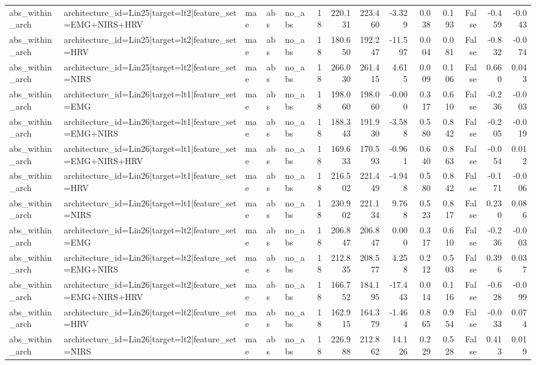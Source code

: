 \begin{table}
\begin{tabular}{lllllrrrrrrrrr}
abs_within_arch & architecture_id=Lin25|target=lt2|feature_set=EMG+NIRS+HRV & mae & abs & no_abs & 18 & 220.131 & 223.460 & -3.329 & 0.038 & 0.193 & False & -0.459 & -0.043 \\
abs_within_arch & architecture_id=Lin25|target=lt2|feature_set=HRV & mae & abs & no_abs & 18 & 180.650 & 192.247 & -11.597 & 0.004 & 0.081 & False & -0.832 & -0.074 \\
abs_within_arch & architecture_id=Lin25|target=lt2|feature_set=NIRS & mae & abs & no_abs & 18 & 266.030 & 261.415 & 4.615 & 0.009 & 0.106 & False & 0.660 & 0.043 \\
abs_within_arch & architecture_id=Lin26|target=lt1|feature_set=EMG & mae & abs & no_abs & 18 & 198.060 & 198.060 & -0.000 & 0.317 & 0.610 & False & -0.236 & -0.003 \\
abs_within_arch & architecture_id=Lin26|target=lt1|feature_set=EMG+NIRS & mae & abs & no_abs & 18 & 188.343 & 191.930 & -3.588 & 0.580 & 0.842 & False & -0.205 & -0.019 \\
abs_within_arch & architecture_id=Lin26|target=lt1|feature_set=EMG+NIRS+HRV & mae & abs & no_abs & 18 & 169.633 & 170.593 & -0.961 & 0.640 & 0.863 & False & -0.054 & 0.012 \\
abs_within_arch & architecture_id=Lin26|target=lt1|feature_set=HRV & mae & abs & no_abs & 18 & 216.502 & 221.449 & -4.948 & 0.580 & 0.842 & False & -0.171 & -0.006 \\
abs_within_arch & architecture_id=Lin26|target=lt1|feature_set=NIRS & mae & abs & no_abs & 18 & 230.902 & 221.134 & 9.768 & 0.523 & 0.817 & False & 0.230 & 0.086 \\
abs_within_arch & architecture_id=Lin26|target=lt2|feature_set=EMG & mae & abs & no_abs & 18 & 206.847 & 206.847 & 0.000 & 0.317 & 0.610 & False & -0.236 & -0.003 \\
abs_within_arch & architecture_id=Lin26|target=lt2|feature_set=EMG+NIRS & mae & abs & no_abs & 18 & 212.835 & 208.577 & 4.258 & 0.212 & 0.503 & False & 0.396 & 0.037 \\
abs_within_arch & architecture_id=Lin26|target=lt2|feature_set=EMG+NIRS+HRV & mae & abs & no_abs & 18 & 166.752 & 184.195 & -17.443 & 0.014 & 0.116 & False & -0.628 & -0.099 \\
abs_within_arch & architecture_id=Lin26|target=lt2|feature_set=HRV & mae & abs & no_abs & 18 & 162.915 & 164.379 & -1.464 & 0.865 & 0.954 & False & -0.033 & 0.074 \\
abs_within_arch & architecture_id=Lin26|target=lt2|feature_set=NIRS & mae & abs & no_abs & 18 & 226.988 & 212.862 & 14.126 & 0.229 & 0.528 & False & 0.413 & 0.019 \\

\end{tabular}
\end{table}
